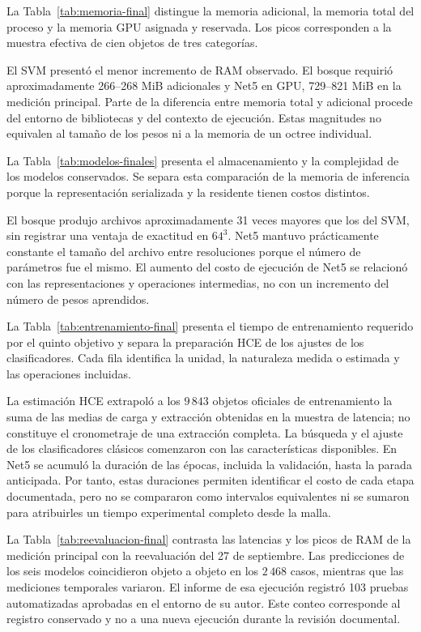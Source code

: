 La Tabla~\ref{tab:memoria-final} distingue la memoria adicional, la memoria total del proceso y la memoria GPU asignada y reservada. Los picos corresponden a la muestra efectiva de cien objetos de tres categorías.


El SVM presentó el menor incremento de RAM observado. El bosque requirió aproximadamente 266--268 MiB adicionales y Net5 en GPU, 729--821 MiB en la medición principal. Parte de la diferencia entre memoria total y adicional procede del entorno de bibliotecas y del contexto de ejecución. Estas magnitudes no equivalen al tamaño de los pesos ni a la memoria de un octree individual.

La Tabla~\ref{tab:modelos-finales} presenta el almacenamiento y la complejidad de los modelos conservados. Se separa esta comparación de la memoria de inferencia porque la representación serializada y la residente tienen costos distintos.


El bosque produjo archivos aproximadamente 31 veces mayores que los del SVM, sin registrar una ventaja de exactitud en $64^3$. Net5 mantuvo prácticamente constante el tamaño del archivo entre resoluciones porque el número de parámetros fue el mismo. El aumento del costo de ejecución de Net5 se relacionó con las representaciones y operaciones intermedias, no con un incremento del número de pesos aprendidos.

La Tabla~\ref{tab:entrenamiento-final} presenta el tiempo de entrenamiento requerido por el quinto objetivo y separa la preparación HCE de los ajustes de los clasificadores. Cada fila identifica la unidad, la naturaleza medida o estimada y las operaciones incluidas.


La estimación HCE extrapoló a los $9\,843$ objetos oficiales de entrenamiento la suma de las medias de carga y extracción obtenidas en la muestra de latencia; no constituye el cronometraje de una extracción completa. La búsqueda y el ajuste de los clasificadores clásicos comenzaron con las características disponibles. En Net5 se acumuló la duración de las épocas, incluida la validación, hasta la parada anticipada. Por tanto, estas duraciones permiten identificar el costo de cada etapa documentada, pero no se compararon como intervalos equivalentes ni se sumaron para atribuirles un tiempo experimental completo desde la malla.

La Tabla~\ref{tab:reevaluacion-final} contrasta las latencias y los picos de RAM de la medición principal con la reevaluación del 27 de septiembre. Las predicciones de los seis modelos coincidieron objeto a objeto en los $2\,468$ casos, mientras que las mediciones temporales variaron. El informe de esa ejecución registró 103 pruebas automatizadas aprobadas en el entorno de su autor. Este conteo corresponde al registro conservado y no a una nueva ejecución durante la revisión documental.


